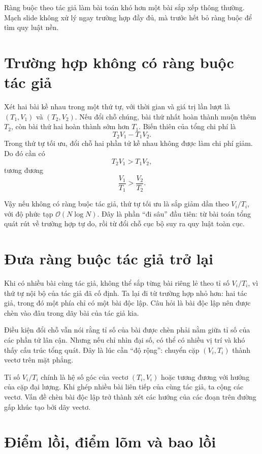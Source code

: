 \documentclass[11pt]{article}
\newcommand{\Oh}{\mathcal{O}}
\begin{document}
Ràng buộc theo tác giả làm bài toán khó hơn một bài sắp xếp thông thường. Mạch
slide không xử lý ngay trường hợp đầy đủ, mà trước hết bỏ ràng buộc để tìm
quy luật nền.

\section{Trường hợp không có ràng buộc tác giả}

Xét hai bài kề nhau trong một thứ tự, với thời gian và giá trị lần lượt là
\((T_1,V_1)\) và \((T_2,V_2)\). Nếu đổi chỗ chúng, bài thứ nhất hoàn thành
muộn thêm \(T_2\), còn bài thứ hai hoàn thành sớm hơn \(T_1\). Biến thiên của
tổng chi phí là
\[
  T_2V_1 - T_1V_2.
\]
Trong thứ tự tối ưu, đổi chỗ hai phần tử kề nhau không được làm chi phí giảm.
Do đó cần có
\[
  T_2V_1 > T_1V_2,
\]
tương đương
\[
  \frac{V_1}{T_1} > \frac{V_2}{T_2}.
\]

Vậy nếu không có ràng buộc tác giả, thứ tự tối ưu là sắp giảm dần theo
\(V_i/T_i\), với độ phức tạp \(\Oh(N\log N)\). Đây là phần ``đi sâu'' đầu
tiên: từ bài toán tổng quát rút về trường hợp tự do, rồi từ đổi chỗ cục bộ
suy ra quy luật toàn cục.

\section{Đưa ràng buộc tác giả trở lại}

Khi có nhiều bài cùng tác giả, không thể sắp từng bài riêng lẻ theo tỉ số
\(V_i/T_i\), vì thứ tự nội bộ của tác giả đã cố định. Ta lại đi từ trường hợp
nhỏ hơn: hai tác giả, trong đó một phía chỉ có một bài độc lập. Câu hỏi là
bài độc lập nên được chèn vào đâu trong dãy bài của tác giả kia.

Điều kiện đổi chỗ vẫn nói rằng tỉ số của bài được chèn phải nằm giữa tỉ số
của các phần tử lân cận. Nhưng nếu chỉ nhìn đại số, có thể có nhiều vị trí và
khó thấy cấu trúc tổng quát. Đây là lúc cần ``độ rộng'': chuyển cặp
\((V_i,T_i)\) thành vectơ trên mặt phẳng.

Tỉ số \(V_i/T_i\) chính là hệ số góc của vectơ \((T_i,V_i)\) hoặc tương đương
với hướng của cặp đại lượng. Khi ghép nhiều bài liên tiếp của cùng tác giả,
ta cộng các vectơ. Vấn đề chèn bài độc lập trở thành xét các hướng của các
đoạn trên đường gấp khúc tạo bởi dãy vectơ.

\section{Điểm lồi, điểm lõm và bao lồi}
\end{document}
